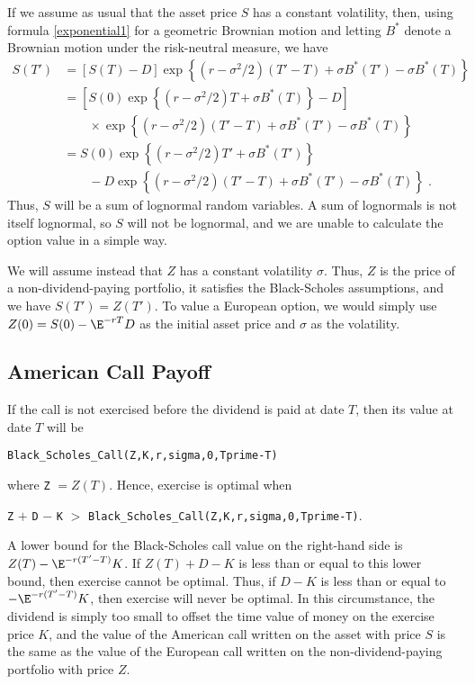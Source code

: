 If we assume as usual that the asset price $S$ has a constant volatility, then, using formula \eqref{exponential1} for a geometric Brownian motion and letting $B^*$ denote a Brownian motion under the risk-neutral measure, we have
\begin{align*}
S(T') &= [S(T)-D]\exp\left\{(r-\sigma^2/2)(T'-T)+\sigma B^*(T')-\sigma B^*(T)\right\}\\
&= \left[S(0)\exp\left\{(r-\sigma^2/2)T+\sigma B^*(T)\right\}-D\right]\\
&\qquad \times \exp\left\{(r-\sigma^2/2)(T'-T)+\sigma B^*(T')-\sigma B^*(T)\right\}\\
&=S(0)\exp\left\{(r-\sigma^2/2)T'+\sigma B^*(T')\right\} \\
&\qquad - D\exp\left\{(r-\sigma^2/2)(T'-T)+\sigma B^*(T')-\sigma B^*(T)\right\}\;.
\end{align*}
Thus, $S$ will be a sum of lognormal random variables.  A sum of lognormals is not itself lognormal, so $S$ will not be lognormal, and we are unable to calculate the option value in a simple way.

We will assume instead that $Z$ has a constant volatility $\sigma$.  Thus, $Z$ is the price of a non-dividend-paying portfolio, it satisfies the Black-Scholes assumptions, and we have $S(T')=Z(T')$.  To value a European option, we would simply use $Z(0)=S(0)-\E^{-rT}D$ as the initial asset price and $\sigma$ as the volatility.

\subsection*{American Call Payoff}
If the call is not exercised before the dividend is paid at date $T$, then its value at date $T$ will be
\begin{center}
\verb!Black_Scholes_Call(Z,K,r,sigma,0,Tprime-T)!
\end{center}
where  \verb!Z! $=Z(T)$.  Hence, exercise is optimal when
\begin{center}
\verb!Z! $+$ \verb!D! $-$ \verb!K! $>$ \verb!Black_Scholes_Call(Z,K,r,sigma,0,Tprime-T)!\;.
\end{center}
A lower bound for the Black-Scholes call value on the right-hand side is $Z(T)-\E^{-r(T'-T)}K$.  If $Z(T)+D-K$ is less than or equal to this lower bound, then exercise cannot be optimal.  Thus, if $D-K$ is less than or equal to $-\E^{-r(T'-T)}K$, then exercise will never be optimal.  In this circumstance, the dividend is simply too small to offset the time value of money on the exercise price $K$,  and the value of the American call written on the asset with price $S$ is the same as the value of the European call written on the non-dividend-paying portfolio with price $Z$.  

